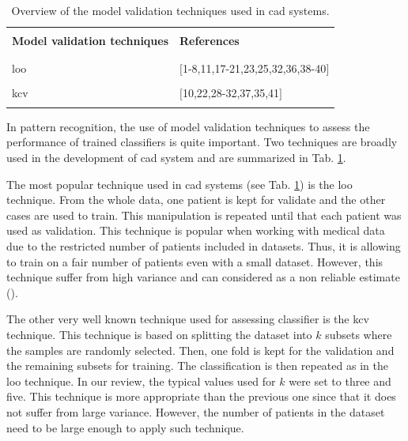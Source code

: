 \begin{table}
	\caption{Overview of the model validation techniques used in \ac{cad} systems.}
	\small
	\begin{tabular}{p{.55\linewidth} p{.35\linewidth}}
		\hline \\ [-1.5ex]
		\textbf{Model validation techniques} & \textbf{References} \\ \\ [-1.5ex]
		\hline \\ [-1.5ex]
		\quad \acs{loo} & $[$1-8,11,17-21,23,25,32,36,38-40$]$ \\ \\ [-1.5ex]
		\quad \acs{kcv} & $[$10,22,28-32,37,35,41$]$ \\ \\ [-1.5ex]
		\hline
	\end{tabular}
	\label{tab:valmod}
\end{table}

In pattern recognition, the use of model validation techniques to assess the performance of trained classifiers is quite important. Two techniques are broadly used in the development of \ac{cad} system and are summarized in Tab. \ref{tab:valmod}.

The most popular technique used in \ac{cad} systems (see Tab. \ref{tab:valmod}) is the \acf{loo} technique. From the whole data, one patient is kept for validate and the other cases are used to train. This manipulation is repeated until that each patient was used as validation. This technique is popular when working with medical data due to the restricted number of patients included in datasets. Thus, it is allowing to train on a fair number of patients even with a small dataset. However, this technique suffer from high variance and can considered as a non reliable estimate (\cite{Efron1983}).

The other very well known technique used for assessing classifier is the \acf{kcv} technique. This technique is based on splitting the dataset into $k$ subsets where the samples are randomly selected. Then, one fold is kept for the validation and the remaining subsets for training. The classification is then repeated as in the \ac{loo} technique. In our review, the typical values used for $k$ were set to three and five. This technique is more appropriate than the previous one since that it does not suffer from large variance. However, the number of patients in the dataset need to be large enough to apply such technique.

